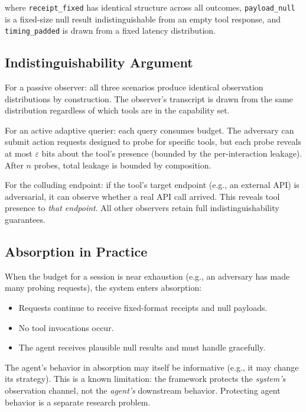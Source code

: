\documentclass[11pt,a4paper]{article}
\begin{document}
where \texttt{receipt\_fixed} has identical structure across all outcomes, \texttt{payload\_null} is a fixed-size null result indistinguishable from an empty tool response, and \texttt{timing\_padded} is drawn from a fixed latency distribution.

\subsection{Indistinguishability Argument}

For a passive observer: all three scenarios produce identical observation distributions by construction. The observer's transcript is drawn from the same distribution regardless of which tools are in the capability set.

For an active adaptive querier: each query consumes budget. The adversary can submit action requests designed to probe for specific tools, but each probe reveals at most $\varepsilon$ bits about the tool's presence (bounded by the per-interaction leakage). After $n$ probes, total leakage is bounded by composition.

For the colluding endpoint: if the tool's target endpoint (e.g., an external API) is adversarial, it can observe whether a real API call arrived. This reveals tool presence to \textit{that endpoint}. All other observers retain full indistinguishability guarantees.

\subsection{Absorption in Practice}

When the budget for a session is near exhaustion (e.g., an adversary has made many probing requests), the system enters absorption:

\begin{itemize}
  \item Requests continue to receive fixed-format receipts and null payloads.
  \item No tool invocations occur.
  \item The agent receives plausible null results and must handle gracefully.
\end{itemize}

The agent's behavior in absorption may itself be informative (e.g., it may change its strategy). This is a known limitation: the framework protects the \textit{system's} observation channel, not the \textit{agent's} downstream behavior. Protecting agent behavior is a separate research problem.
\end{document}
